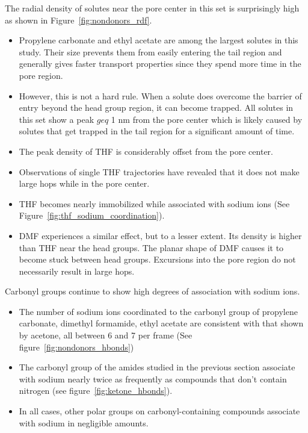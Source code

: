 \documentclass{article}
\begin{document}
  The radial density of solutes near the pore center in this set is surprisingly high
  as shown in Figure~\ref{fig:nondonors_rdf}.
  \begin{itemize}
    \item Propylene carbonate and ethyl acetate are among the largest solutes
    in this study. Their size prevents them from easily entering the tail 
    region and generally gives faster transport properties since they spend
    more time in the pore region. 
    \item However, this is not a hard rule. When a solute does overcome the 
    barrier of entry beyond the head group region, it can become trapped. All
    solutes in this set show a peak $geq$ 1 nm from the pore center which is
    likely caused by solutes that get trapped in the tail region for a significant
    amount of time.
	\item The peak density of THF is considerably offset from the pore center.
	\item Observations of single THF trajectories have revealed that it does not make
	large hops while in the pore center.
	\item THF becomes nearly immobilized while associated with sodium ions (See 
	Figure~\ref{fig:thf_sodium_coordination}).
	\item DMF experiences a similar effect, but to a lesser extent. Its density is 
	higher than THF near the head groups. The planar shape of DMF causes it to 
	become stuck between head groups. Excursions into the pore region do not
	necessarily result in large hops.
  \end{itemize}
  
  Carbonyl groups continue to show high degrees of association with sodium ions. 
  \begin{itemize}
    \item The number of sodium ions coordinated to the carbonyl group of 
    propylene carbonate, dimethyl formamide, ethyl acetate are consistent with 
    that shown by acetone, all between 6 and 7 per frame (See 
    figure~\ref{fig:nondonors_hbonds})
    \item The carbonyl group of the amides studied in the previous section
    associate with sodium nearly twice as frequently as compounds that don't
    contain nitrogen (see figure~\ref{fig:ketone_hbonds}).
    \item In all cases, other polar groups on carbonyl-containing compounds
    associate with sodium in negligible amounts.
  \end{itemize}
 
\end{document}
